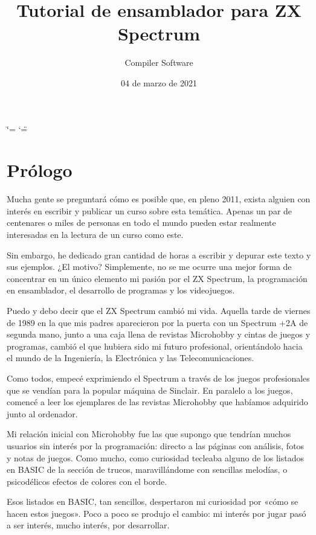 \documentclass[letterpaper,10pt,spanish]{sphinxmanual}
\title{Tutorial de ensamblador para ZX Spectrum}
\date{04 de marzo de 2021}
\author{Compiler Software}
\begin{document}
\ifdefined\shorthandoff
  \ifnum\catcode`\=\string=\active\shorthandoff{=}\fi
  \ifnum\catcode`\"=\active{}\fi
\fi

\pagestyle{empty}
\sphinxmaketitle
\pagestyle{plain}
\sphinxtableofcontents
\pagestyle{normal}
\label{\detokenize{index::doc}}



\chapter{Prólogo}
\label{\detokenize{01_prologo/prologo:prologo}}\label{\detokenize{01_prologo/prologo::doc}}
Mucha gente se preguntará cómo es posible que, en pleno 2011, exista alguien con interés en escribir y publicar un curso sobre esta temática. Apenas un par de centenares o miles de personas en todo el mundo pueden estar realmente interesadas en la lectura de un curso como este.

Sin embargo, he dedicado gran cantidad de horas a escribir y depurar este texto y sus ejemplos. ¿El motivo? Simplemente, no se me ocurre una mejor forma de concentrar en un único elemento mi pasión por el ZX Spectrum, la programación en ensamblador, el desarrollo de programas y los videojuegos.

Puedo y debo decir que el ZX Spectrum cambió mi vida. Aquella tarde de viernes de 1989 en la que mis padres aparecieron por la puerta con un Spectrum +2A de segunda mano, junto a una caja llena de revistas Microhobby y cintas de juegos y programas, cambió el que hubiera sido mi futuro profesional, orientándolo hacia el mundo de la Ingeniería, la Electrónica y las Telecomunicaciones.

Como todos, empecé exprimiendo el Spectrum a través de los juegos profesionales que se vendían para la popular máquina de Sinclair. En paralelo a los juegos, comencé a leer los ejemplares de las revistas Microhobby que habíamos adquirido junto al ordenador.

Mi relación inicial con Microhobby fue las que supongo que tendrían muchos usuarios sin interés por la programación: directo a las páginas con análisis, fotos y notas de juegos. Como mucho, como curiosidad tecleaba alguno de los listados en BASIC de la sección de trucos, maravillándome con sencillas melodías, o psicodélicos efectos de colores con el borde.

Esos listados en BASIC, tan sencillos, despertaron mi curiosidad por «cómo se hacen estos juegos». Poco a poco se produjo el cambio: mi interés por jugar pasó a ser interés, mucho interés, por desarrollar.
\end{document}
